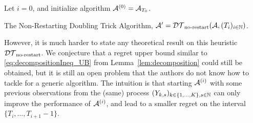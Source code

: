 \documentclass[12pt]{colt2018} %
\begin{document}
\vspace*{5pt}  %
\begin{algorithm}[H]
        \LinesNumbered  %
        \DontPrintSemicolon
        \BlankLine
        Let $i = 0$, and initialize algorithm $\mathcal{A}^{(0)} = \mathcal{A}_{T_0}$.\\
        \caption{The Non-Restarting Doubling Trick Algorithm, $\mathcal{A}' = \mathcal{DT}_{\text{no-restart}}(\mathcal{A}, (T_i)_{i\in\mathbb{N}})$.}
\label{algo:DTnr}
\end{algorithm}
\vspace*{10pt}  %


However, it is much harder to state any  theoretical result on this heuristic $\mathcal{DT}_{\text{no-restart}}$.
We conjecture that a regret upper bound similar to \eqref{eq:decompositionIneq_UB} from Lemma~\ref{lem:decomposition} could still be obtained, but it is still an open problem that the authors do not know how to tackle for a generic algorithm.
%
The intuition is that starting $\mathcal{A}^{(i)}$ with some previous observations from the (same) \iid{} process $(Y_{k,s})_{k\in\{1,\dots,K\},s\in\mathbb{N}}$ can only improve the performance of $\mathcal{A}^{(i)}$,
and lead to a smaller regret on the interval $\{T_{i},\dots,T_{i+1}-1\}$.
\end{document}
